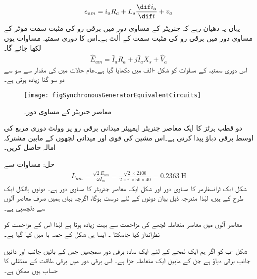 \begin{align}
e_{am}=i_a R_a+L_s \frac{\dif i_a}{\dif t}+v_a
\end{align}
یہاں یہ دھیان رہے کہ جنریٹر کے مساوی دور میں برقی رو کی مثبت سمت موٹر کے مساوی دور میں برقی رو کی مثبت سمت کے اُلٹ ہے۔اس کا دوری سمتیہ مساوات یوں لکھا جائے گا۔
\begin{align}
\hat{E}_{am}= \hat{I}_a R_a+j \hat{I}_a X_s +\hat{V}_a
\end{align}
اس دوری سمتیہ کے مساوات کو شکل -الف میں دکھایا گیا ہے۔عام حالات میں  کی مقدار   سے سو سے دو سو گنا زیادہ ہوتی ہے۔ 
\begin{figure}
\centering
\texttt{[image: figSynchronousGeneratorEquivalentCircuits]}
\caption{معاصر جنریٹر کے مساوی دور۔}
\label{شکل_معاصر_جنریٹر_کے_سادہ_مساوی_دور}
\end{figure}

دو قطب  ہرٹز کا ایک معاصر جنریٹر  ایمپیئر میدانی برقی رو پر   وولٹ دوری مربع کی اوسط برقی دباؤ پیدا کرتی ہے۔اس مشین کی قوی اور میدانی لچھوں کے مابین مشترکہ امالہ حاصل کریں۔

	حل:
	مساوات  سے 
\begin{align}
L_{am}=\frac{\sqrt{2} E_{am}}{\omega I_m}=\frac{\sqrt{2}  \times 2100}{2 \times \pi \times 50 \times 40}=\SI{0.2363}{\henry}
\end{align}
%
شکل    ایک ٹرانسفارمر کا مساوی دور اور شکل   ایک معاصر جنریٹر کا مساوی دور ہے۔ دونوں بالکل ایک طرح کے ہیں، لہٰذا مندرجہ ذیل بیان دونوں کے لئے درست ہوگا، اگرچہ یہاں ہمیں صرف معاصر آلوں سے دلچسپی ہے۔

معاصر آلوں میں معاصر متعاملہ لچھے کی مزاحمت سے بہت زیادہ ہوتا ہے لہٰذا اس کے مزاحمت کو نظرانداز کیا جاسکتا ۔ ایسا ہی شکل کے حصہ با میں کیا گیا ہے۔

شکل -ب کو اگر ہم ایک لمحے کے لئے ایک سادہ برقی دور سمجھیں جس کے بائیں جانب  اور دائیں جانب  برقی دباؤ ہے جن کے مابین ایک متعاملہ  جڑا ہے۔ اس برقی دور میں برقی طاقت کے منتقلی کا حساب یوں ممکن ہے۔

